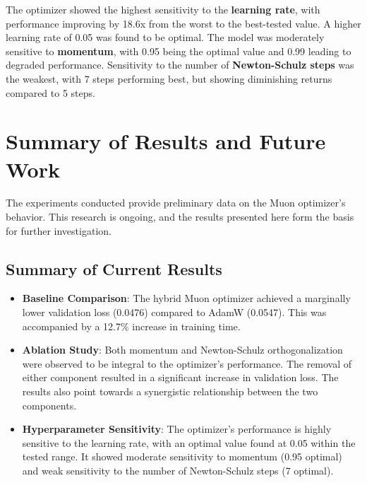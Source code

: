 \documentclass[11pt, a4paper]{article}
\begin{document}
The optimizer showed the highest sensitivity to the \textbf{learning rate}, with performance improving by 18.6x from the worst to the best-tested value. A higher learning rate of 0.05 was found to be optimal. The model was moderately sensitive to \textbf{momentum}, with 0.95 being the optimal value and 0.99 leading to degraded performance. Sensitivity to the number of \textbf{Newton-Schulz steps} was the weakest, with 7 steps performing best, but showing diminishing returns compared to 5 steps.

\section{Summary of Results and Future Work}
The experiments conducted provide preliminary data on the Muon optimizer's behavior. This research is ongoing, and the results presented here form the basis for further investigation.

\subsection{Summary of Current Results}
\begin{itemize}
    \item \textbf{Baseline Comparison}: The hybrid Muon optimizer achieved a marginally lower validation loss (0.0476) compared to AdamW (0.0547). This was accompanied by a 12.7\% increase in training time.
    \item \textbf{Ablation Study}: Both momentum and Newton-Schulz orthogonalization were observed to be integral to the optimizer's performance. The removal of either component resulted in a significant increase in validation loss. The results also point towards a synergistic relationship between the two components.
    \item \textbf{Hyperparameter Sensitivity}: The optimizer's performance is highly sensitive to the learning rate, with an optimal value found at 0.05 within the tested range. It showed moderate sensitivity to momentum (0.95 optimal) and weak sensitivity to the number of Newton-Schulz steps (7 optimal).
\end{itemize}
\end{document}
